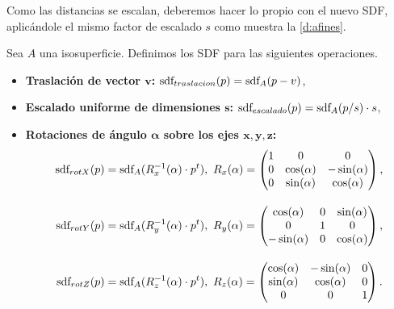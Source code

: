 Como las distancias se escalan, deberemos hacer lo propio con el nuevo SDF, aplicándole el mismo factor de escalado $s$ como muestra la \autoref{d:afines}.

\begin{definicion}\label{d:afines}
    Sea $A$ una isosuperficie. Definimos los SDF para las siguientes operaciones.
    \begin{itemize}
        \item \textbf{Traslación de vector $\boldsymbol{v}$: } $\text{sdf}_{traslacion}(p) = \text{sdf}_{A}(p - v)$,
        \item \textbf{Escalado uniforme de dimensiones $\boldsymbol{s}$: } $\text{sdf}_{escalado}(p) = \text{sdf}_{A}(p/s)\cdot s$,
        \item \textbf{Rotaciones de ángulo $\boldsymbol{\alpha}$ sobre los ejes $\boldsymbol{x,y,z}$: }
        \begin{align*}
            \sdf_{rotX}(p) &= \sdf_{A}(R_x^{-1}(\alpha)\cdot p^t),\ R_x(\alpha) = 
            \begin{pmatrix}
                1&0&0\\
                0&\cos(\alpha) & -\sin(\alpha) \\
                0&\sin(\alpha) & \cos(\alpha) 
                \end{pmatrix},\\[10pt] 
            \sdf_{rotY}(p) &= \sdf_{A}(R_y^{-1}(\alpha)\cdot p^t),\ R_y(\alpha) = \begin{pmatrix}
            \cos(\alpha) &0& \sin(\alpha)\\
            0&1&0\\
            -\sin(\alpha) &0& \cos(\alpha) 
            \end{pmatrix},\\[10pt]
            \sdf_{rotZ}(p) &= \sdf_{A}(R_z^{-1}(\alpha)\cdot p^t),\ R_z(\alpha) = \begin{pmatrix}
            \cos(\alpha) & -\sin(\alpha) & 0\\
            \sin(\alpha) & \cos(\alpha) & 0\\
            0&0&1
            \end{pmatrix}.
        \end{align*}
        
    \end{itemize}
\end{definicion}

